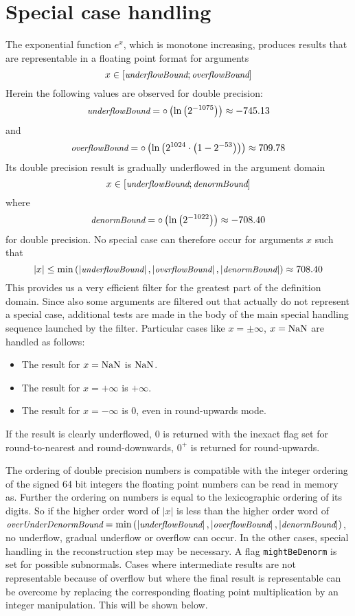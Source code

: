 \section{Special case handling}\label{sec:expspecial}
The exponential function $e^x$, which is monotone increasing, produces
results that are representable in a floating point format for
arguments $$x \in \left[ \mbox{\small \it underflowBound};
\mbox{\small \it overflowBound} \right]$$ Herein the following values
are observed for double precision: $$\mbox{\small \it underflowBound}
= \circ \left( \ln\left(2^{-1075} \right) \right) \approx -745.13$$
and $$\mbox{\small \it overflowBound} = \circ \left(
\ln\left(2^{1024} \cdot \left( 1 - 2^{-53} \right) \right) \right)
\approx 709.78$$ Its double precision result is gradually underflowed
in the argument domain $$x \in \left[\mbox{\small \it underflowBound};
\mbox{\small \it denormBound} \right]$$ where
$$\mbox{\small \it denormBound} = \circ\left( \ln\left( 2^{-1022}
\right) \right) \approx -708.40$$ for double precision.  No special
case can therefore occur for arguments $x$ such that $$\left \vert x
\right \vert \leq \min \left( \left \vert \mbox{\small \it
underflowBound} \right \vert, \left \vert \mbox{\small \it
overflowBound} \right \vert, \left \vert \mbox{\small \it denormBound}
\right \vert \right) \approx 708.40$$ This provides us a very
efficient filter for the greatest part of the definition domain.
Since also some arguments are filtered out that actually do not
represent a special case, additional tests are made in the body of the
main special handling sequence launched by the filter. Particular cases like
$x=\pm \infty$, $x = \mathrm{NaN}$ are handled as follows:
\begin{itemize}
\item The result for $x = \mathrm{NaN}$ is $\mathrm{NaN}$.
\item The result for $x = + \infty$ is $+ \infty$.
\item The result for $x = - \infty$ is $0$, even in round-upwards mode.
\end{itemize}
If the result is clearly underflowed, $0$ is returned with the inexact
flag set for round-to-nearest and round-downwards, $0^+$ is returned
for round-upwards.

The ordering of double precision numbers is compatible with the
integer ordering of the signed 64 bit integers the floating point
numbers can be read in memory as. Further the ordering on numbers is
equal to the lexicographic ordering of its digits. So if the higher
order word of $\left \vert x \right \vert$ is less than the higher
order word of $\mbox{\small \it overUnderDenormBound} = \min \left(
\left \vert \mbox{\small \it underflowBound} \right \vert, \left \vert
\mbox{\small \it overflowBound} \right \vert, \left \vert \mbox{\small
\it denormBound} \right \vert \right)$, no underflow, gradual
underflow or overflow can occur. In the other cases, special handling
in the reconstruction step may be necessary. A flag
\texttt{mightBeDenorm} is set for possible subnormals. Cases where
intermediate results are not representable because of overflow but
where the final result is representable can be overcome by replacing
the corresponding floating point multiplication by an integer
manipulation. This will be shown below.

